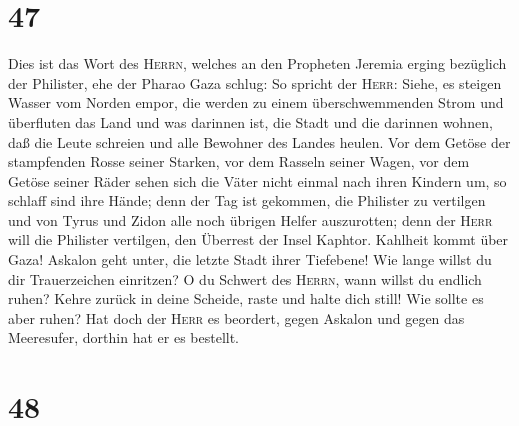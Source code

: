 \hypertarget{section-46}{%
\section{47}\label{section-46}}

 Dies ist das Wort des \textsc{Herrn}, welches an den
Propheten Jeremia erging bezüglich der Philister, ehe der Pharao Gaza
schlug:  So spricht der \textsc{Herr}: Siehe, es steigen
Wasser vom Norden empor, die werden zu einem überschwemmenden Strom und
überfluten das Land und was darinnen ist, die Stadt und die darinnen
wohnen, daß die Leute schreien und alle Bewohner des Landes heulen.
 Vor dem Getöse der stampfenden Rosse seiner Starken, vor
dem Rasseln seiner Wagen, vor dem Getöse seiner Räder sehen sich die
Väter nicht einmal nach ihren Kindern um, so schlaff sind ihre Hände;
 denn der Tag ist gekommen, die Philister zu vertilgen und
von Tyrus und Zidon alle noch übrigen Helfer auszurotten; denn der
\textsc{Herr} will die Philister vertilgen, den Überrest der Insel
Kaphtor.  Kahlheit kommt über Gaza! Askalon geht unter,
die letzte Stadt ihrer Tiefebene! Wie lange willst du dir Trauerzeichen
einritzen?  O du Schwert des \textsc{Herrn}, wann willst
du endlich ruhen? Kehre zurück in deine Scheide, raste und halte dich
still!  Wie sollte es aber ruhen? Hat doch der
\textsc{Herr} es beordert, gegen Askalon und gegen das Meeresufer,
dorthin hat er es bestellt.

\hypertarget{section-47}{%
\section{48}\label{section-47}}

